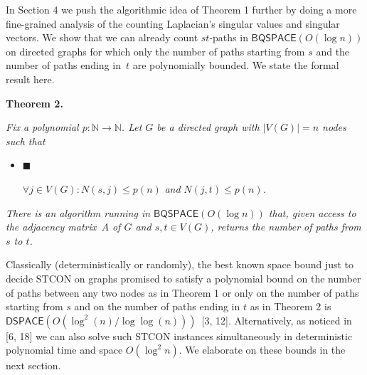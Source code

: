 \documentclass[10pt,a4paper]{article}
\begin{document}
In Section 4 we push the algorithmic idea of Theorem 1 further by doing a more fine-grained analysis of the counting Laplacian’s singular values and singular vectors.
We show that we can already count $st$-paths in $\mathsf{BQSPACE}(O(\log n))$ on directed graphs for which only the number of paths starting from $s$ and the number of paths ending in $t$ are polynomially bounded.
We state the formal result here.\par






\par\medskip\noindent\textbf{
\textbf{Theorem 2}\textbf{.}
}\par



\emph{Fix a polynomial $p:\mathbb{N}\rightarrow\mathbb{N}$. Let $G$ be a directed graph with $|V(G)|=n$ nodes such that}\par


\begin{itemize}


\item[] 
$\blacksquare$ 


$\forall j\in V(G):N(s,j)\leq p(n)$\emph{ and }$N(j,t)\leq p(n)$\emph{.}\par





\end{itemize}


\emph{There is an algorithm running in $\mathsf{BQSPACE}(O(\log n))$ that, given access to the adjacency matrix $A$ of $G$ and $s,t\in V(G)$, returns the number of paths from $s$ to $t$.}\par







Classically (deterministically or randomly), the best known space bound just to decide $\mathrm{STCON}$ on graphs promised to satisfy a polynomial bound on the number of paths between any two nodes as in Theorem 1 or only on the number of paths starting from $s$ and on the number of paths ending in $t$ as in Theorem 2 is $\mathsf{DSPACE}(O(\log^{2}(n)/\log\log(n)))$ [3, 12].
Alternatively, as noticed in [6, 18] we can also solve such $\mathrm{STCON}$ instances simultaneously in deterministic polynomial time and space $O(\log^{2}n)$.
We elaborate on these bounds in the next section.\par
\end{document}
